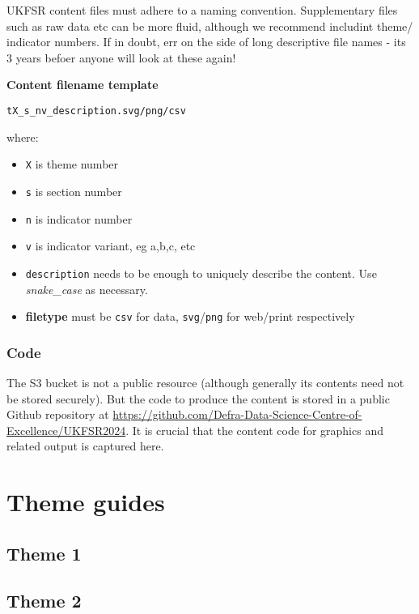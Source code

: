\documentclass[
]{book}
\begin{document}
UKFSR content files must adhere to a naming convention. Supplementary files such
as raw data etc can be more fluid, although we recommend includint theme/
indicator numbers. If in doubt, err on the side of long descriptive file names -
its 3 years befoer anyone will look at these again!

\textbf{Content filename template}

\texttt{tX\_s\_nv\_description.svg/png/csv}

where:

\begin{itemize}
\item
  \texttt{X} is theme number
\item
  \texttt{s} is section number
\item
  \texttt{n} is indicator number
\item
  \texttt{v} is indicator variant, eg a,b,c, etc
\item
  \texttt{description} needs to be enough to uniquely describe the content. Use \emph{snake\_case} as necessary.
\item
  \textbf{filetype} must be \texttt{csv} for data, \texttt{svg}/\texttt{png} for web/print respectively
\end{itemize}

\hypertarget{code}{%
\subsection{Code}\label{code}}

The S3 bucket is not a public resource (although generally its contents need not be stored securely). But the code to produce the content is stored in a public Github repository at \url{https://github.com/Defra-Data-Science-Centre-of-Excellence/UKFSR2024}. It is crucial that the content code for graphics and related output is captured here.

\hypertarget{theme-guides}{%
\chapter{Theme guides}\label{theme-guides}}

\hypertarget{theme-1}{%
\section{Theme 1}\label{theme-1}}

\hypertarget{theme-2}{%
\section{Theme 2}\label{theme-2}}
\end{document}
